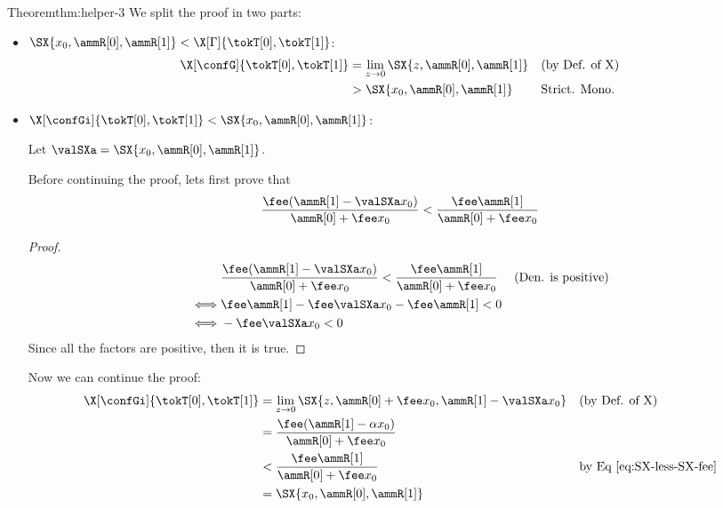 \begin{proofof}{Theorem}{thm:helper-3} 
    We split the proof in two parts: 
    \begin{itemize}
        \item $\SX{x_0, \ammR[0], \ammR[1]} < \X[\Gamma]{\tokT[0],\tokT[1]}$: 
        \begin{align*}
            \X[\confG]{\tokT[0],\tokT[1]} 
                & = \lim_{z \rightarrow 0} \SX{z,\ammR[0],\ammR[1]} && \text{(by Def. of X)}
                \\
                & > \SX{x_0, \ammR[0], \ammR[1]}                    && \text{Strict. Mono.}
        \end{align*}

        \item $\X[\confGi]{\tokT[0],\tokT[1]} < \SX{x_0, \ammR[0], \ammR[1]}$:

            Let $\valSXa = \SX{x_0, \ammR[0], \ammR[1]}$. 
            
            Before continuing the proof, lets first prove that
                \begin{equation}
                    \label{eq:SX-less-SX-fee}
                    \frac{\fee(\ammR[1] - \valSXa x_0)}{\ammR[0] + \fee x_0} < \frac{\fee \ammR[1]}{\ammR[0] + \fee x_0}
                \end{equation}
                \begin{proof}
                    \begin{align*}
                        & \frac{\fee(\ammR[1] - \valSXa x_0)}{\ammR[0] + \fee x_0} < \frac{\fee 
                          \ammR[1]}{\ammR[0] + \fee x_0}    && \text{(Den. is positive)}
                        \\
                        \iff & \fee \ammR[1] - \fee \valSXa x_0 - \fee \ammR[1] < 0
                        \\
                        \iff & - \fee \valSXa x_0 < 0
                    \end{align*}
                    Since all the factors are positive, then it is true.
                \end{proof}
                Now we can continue the proof:
                \begin{align*}
                    \X[\confGi]{\tokT[0],\tokT[1]} 
                    & = 
                    \lim_{z \rightarrow 0} \SX{z,\ammR[0] + \fee x_0,\ammR[1] - \valSXa x_0} && \text{(by Def. of X)}
                    \\
                    & =
                    \frac{\fee(\ammR[1] - \alpha x_0)}{\ammR[0] + \fee x_0}
                    \\
                    & < 
                    \frac{\fee \ammR[1]}{\ammR[0] + \fee x_0} && \text{by Eq~\ref{eq:SX-less-SX-fee}}
                    \\
                    & = 
                    \SX{x_0, \ammR[0], \ammR[1]}
                \end{align*}
    \end{itemize}
\end{proofof}

